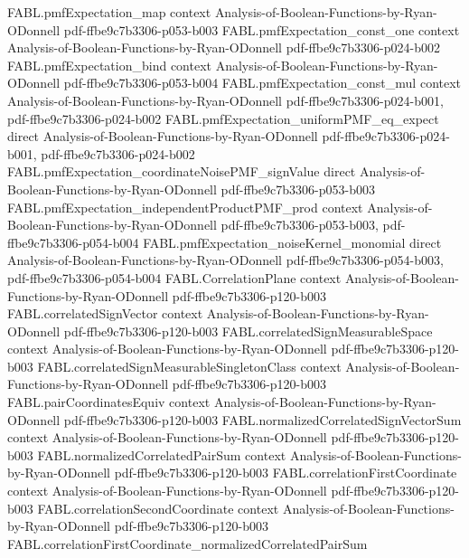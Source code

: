 \begin{theorem}
\proofstep
  {FABL.pmfExpectation_map}
  {context}
  {Analysis-of-Boolean-Functions-by-Ryan-ODonnell}
  {pdf-ffbe9c7b3306-p053-b003}
\proofstep
  {FABL.pmfExpectation_const_one}
  {context}
  {Analysis-of-Boolean-Functions-by-Ryan-ODonnell}
  {pdf-ffbe9c7b3306-p024-b002}
\proofstep
  {FABL.pmfExpectation_bind}
  {context}
  {Analysis-of-Boolean-Functions-by-Ryan-ODonnell}
  {pdf-ffbe9c7b3306-p053-b004}
\proofstep
  {FABL.pmfExpectation_const_mul}
  {context}
  {Analysis-of-Boolean-Functions-by-Ryan-ODonnell}
  {pdf-ffbe9c7b3306-p024-b001,
    pdf-ffbe9c7b3306-p024-b002}
\proofstep
  {FABL.pmfExpectation_uniformPMF_eq_expect}
  {direct}
  {Analysis-of-Boolean-Functions-by-Ryan-ODonnell}
  {pdf-ffbe9c7b3306-p024-b001,
    pdf-ffbe9c7b3306-p024-b002}
\proofstep
  {FABL.pmfExpectation_coordinateNoisePMF_signValue}
  {direct}
  {Analysis-of-Boolean-Functions-by-Ryan-ODonnell}
  {pdf-ffbe9c7b3306-p053-b003}
\proofstep
  {FABL.pmfExpectation_independentProductPMF_prod}
  {context}
  {Analysis-of-Boolean-Functions-by-Ryan-ODonnell}
  {pdf-ffbe9c7b3306-p053-b003,
    pdf-ffbe9c7b3306-p054-b004}
\proofstep
  {FABL.pmfExpectation_noiseKernel_monomial}
  {direct}
  {Analysis-of-Boolean-Functions-by-Ryan-ODonnell}
  {pdf-ffbe9c7b3306-p054-b003,
    pdf-ffbe9c7b3306-p054-b004}
\proofstep
  {FABL.CorrelationPlane}
  {context}
  {Analysis-of-Boolean-Functions-by-Ryan-ODonnell}
  {pdf-ffbe9c7b3306-p120-b003}
\proofstep
  {FABL.correlatedSignVector}
  {context}
  {Analysis-of-Boolean-Functions-by-Ryan-ODonnell}
  {pdf-ffbe9c7b3306-p120-b003}
\proofstep
  {FABL.correlatedSignMeasurableSpace}
  {context}
  {Analysis-of-Boolean-Functions-by-Ryan-ODonnell}
  {pdf-ffbe9c7b3306-p120-b003}
\proofstep
  {FABL.correlatedSignMeasurableSingletonClass}
  {context}
  {Analysis-of-Boolean-Functions-by-Ryan-ODonnell}
  {pdf-ffbe9c7b3306-p120-b003}
\proofstep
  {FABL.pairCoordinatesEquiv}
  {context}
  {Analysis-of-Boolean-Functions-by-Ryan-ODonnell}
  {pdf-ffbe9c7b3306-p120-b003}
\proofstep
  {FABL.normalizedCorrelatedSignVectorSum}
  {context}
  {Analysis-of-Boolean-Functions-by-Ryan-ODonnell}
  {pdf-ffbe9c7b3306-p120-b003}
\proofstep
  {FABL.normalizedCorrelatedPairSum}
  {context}
  {Analysis-of-Boolean-Functions-by-Ryan-ODonnell}
  {pdf-ffbe9c7b3306-p120-b003}
\proofstep
  {FABL.correlationFirstCoordinate}
  {context}
  {Analysis-of-Boolean-Functions-by-Ryan-ODonnell}
  {pdf-ffbe9c7b3306-p120-b003}
\proofstep
  {FABL.correlationSecondCoordinate}
  {context}
  {Analysis-of-Boolean-Functions-by-Ryan-ODonnell}
  {pdf-ffbe9c7b3306-p120-b003}
\proofstep
  {FABL.correlationFirstCoordinate_normalizedCorrelatedPairSum}

\end{theorem}
